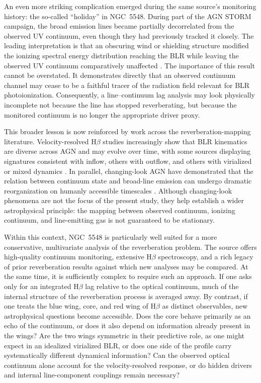 \documentclass[12pt, a4paper]{article}
\begin{document}
An even more striking complication emerged during the same source's monitoring history: the so-called ``holiday'' in NGC~5548. During part of the AGN STORM campaign, the broad emission lines became partially decorrelated from the observed UV continuum, even though they had previously tracked it closely. The leading interpretation is that an obscuring wind or shielding structure modified the ionizing spectral energy distribution reaching the BLR while leaving the observed UV continuum comparatively unaffected \cite{Dehghanian2019}. The importance of this result cannot be overstated. It demonstrates directly that an observed continuum channel may cease to be a faithful tracer of the radiation field relevant for BLR photoionization. Consequently, a line--continuum lag analysis may look physically incomplete not because the line has stopped reverberating, but because the monitored continuum is no longer the appropriate driver proxy.

This broader lesson is now reinforced by work across the reverberation-mapping literature. Velocity-resolved H$\beta$ studies increasingly show that BLR kinematics are diverse across AGN and may evolve over time, with some sources displaying signatures consistent with inflow, others with outflow, and others with virialized or mixed dynamics \cite{Du2018,Wang2025,Feng2024}. In parallel, changing-look AGN have demonstrated that the relation between continuum state and broad-line emission can undergo dramatic reorganization on humanly accessible timescales \cite{RicciTrakhtenbrot2023}. Although changing-look phenomena are not the focus of the present study, they help establish a wider astrophysical principle: the mapping between observed continuum, ionizing continuum, and line-emitting gas is not guaranteed to be stationary.

Within this context, NGC~5548 is particularly well suited for a more conservative, multivariate analysis of the reverberation problem. The source offers high-quality continuum monitoring, extensive H$\beta$ spectroscopy, and a rich legacy of prior reverberation results against which new analyses may be compared. At the same time, it is sufficiently complex to require such an approach. If one asks only for an integrated H$\beta$ lag relative to the optical continuum, much of the internal structure of the reverberation process is averaged away. By contrast, if one treats the blue wing, core, and red wing of H$\beta$ as distinct observables, new astrophysical questions become accessible. Does the core behave primarily as an echo of the continuum, or does it also depend on information already present in the wings? Are the two wings symmetric in their predictive role, as one might expect in an idealized virialized BLR, or does one side of the profile carry systematically different dynamical information? Can the observed optical continuum alone account for the velocity-resolved response, or do hidden drivers and internal line-component couplings remain necessary?
\end{document}
